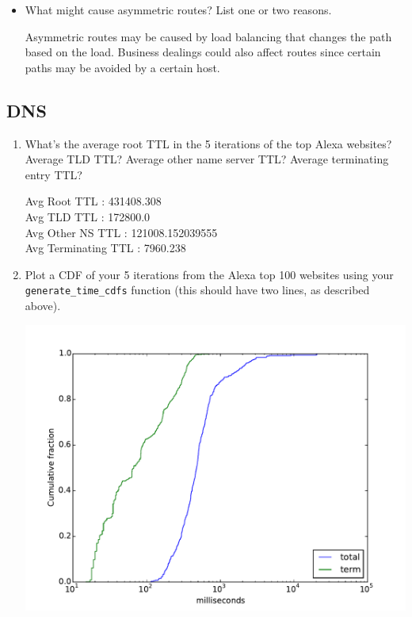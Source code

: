 \documentclass[10pt]{article}
\begin{document}
\begin{enumerate}
\begin{itemize}
\item What might cause asymmetric routes? List one or two reasons.

Asymmetric routes may be caused by load balancing that changes the path based on the load. Business dealings could also affect routes since certain paths may be avoided by a certain host.

\end{itemize}
\end{enumerate}

\newpage
\subsection*{DNS}

\begin{enumerate}

\item What's the average root TTL in the 5 iterations of the top Alexa websites? Average TLD TTL? Average other name server TTL? Average terminating entry TTL?

Avg Root TTL : 431408.308 \\
Avg TLD TTL : 172800.0 \\
Avg Other NS TTL : 121008.152039555 \\
Avg Terminating TTL : 7960.238 \\

\item Plot a CDF of your 5 iterations from the Alexa top 100 websites using your \texttt{generate\_time\_cdfs} function (this should have two lines, as described above).

\includegraphics[scale=0.5]{plot_dig.pdf}


\end{enumerate}
\end{document}
